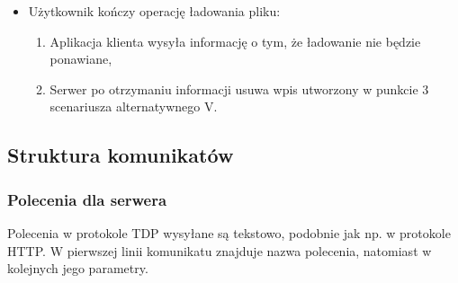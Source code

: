 \documentclass[10pt,a4paper]{article}
\begin{document}
\begin{itemize}
\begin{enumerate}
\begin{itemize}
            \item Użytkownik kończy operację ładowania pliku:
            \begin{enumerate}
                \item Aplikacja klienta wysyła informację o tym, że ładowanie nie będzie ponawiane,
                \item Serwer po otrzymaniu informacji usuwa wpis utworzony w punkcie 3 scenariusza alternatywnego V.
            \end{enumerate}
        \end{itemize}
    \end{enumerate}
\end{itemize}

\subsection{Struktura komunikatów}

\subsubsection{Polecenia dla serwera}
Polecenia w protokole TDP wysyłane są tekstowo, podobnie jak np. w protokole HTTP. W pierwszej linii komunikatu znajduje nazwa polecenia, natomiast w kolejnych jego parametry.
\end{document}
